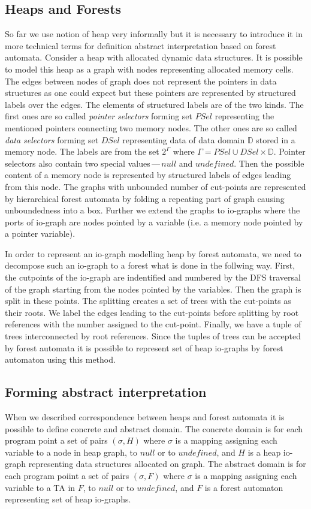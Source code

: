 \documentclass[a4paper, 12pt]{article}
\begin{document}
\subsection{Heaps and Forests}
So far we use notion of heap very informally but it is necessary to introduce
it in more technical terms for definition abstract interpretation based on forest automata.
Consider a heap with allocated dynamic data structures.
It is possible to model this heap as a graph with nodes representing
allocated memory cells.
The edges between nodes of graph does not represent the pointers in data structures
as one could expect but these pointers are represented by structured labels over the edges.
The elements of structured labels are of the two kinds.
The first ones are so called \emph{pointer selectors} forming set $PSel$ representing
the mentioned pointers connecting two memory nodes.
The other ones are so called \emph{data selectors} forming set $DSel$ representing
data of data domain $\mathbb{D}$ stored in a memory node.
The labels are from the set $2^\Gamma$ where $\Gamma = PSel \cup DSel \times \mathbb{D}$.
Pointer selectors also contain two special values\,---\,$null$ and $undefined$.
Then the possible content of a memory node is represented by structured labels of
edges leading from this node.
The graphs with unbounded number of cut-points are represented by hierarchical
forest automata by folding a repeating part of graph causing unboundedness into a box.
Further we extend the graphs to io-graphs where the ports of io-graph are nodes pointed
by a variable (i.e. a memory node pointed by a pointer variable).

In order to represent an io-graph modelling heap by forest automata,
we need to decompose such an io-graph to a forest what is done in the follwing way.
First, the cutpoints of the io-graph are indentified and numbered by
the DFS traversal of the graph starting from the nodes pointed by the variables.
Then the graph is split in these points.
The splitting creates a set of trees with the cut-points as their roots.
We label the edges leading to the cut-points before splitting by root
references with the number assigned to the cut-point.
Finally, we have a tuple of trees interconnected by root references.
Since the tuples of trees can be accepted by forest automata it is
possible to represent set of heap io-graphs by forest automaton using this method.

\subsection{Forming abstract interpretation}
When we described correspondence between heaps and forest automata
it is possible to define concrete and abstract domain.
The concrete domain is for each program point a set of pairs $(\sigma, H)$
where $\sigma$ is a mapping assigning each variable to a node in heap graph,
to $null$ or to $undefined$, and $H$ is a heap io-graph representing data
structures allocated on graph.
The abstract domain is for each program poiint a set of pairs $(\sigma, F)$
where $\sigma$ is a mapping assigning each variable to a TA in $F$,
to $null$ or to $undefined$, and $F$ is a forest automaton representing
set of heap io-graphs.
\end{document}

